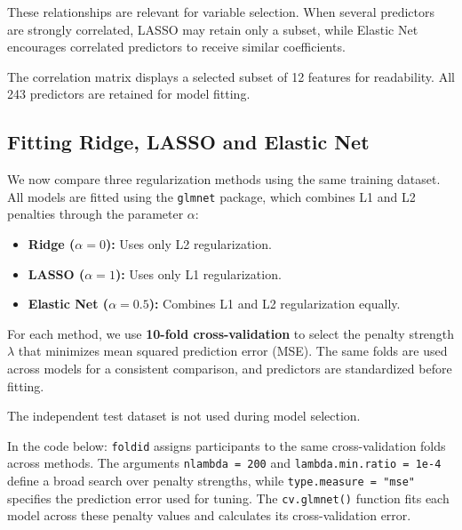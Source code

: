 \documentclass[
  letterpaper,
  DIV=11,
  numbers=noendperiod]{scrreprt}
\providecommand{\tightlist}{%
  \setlength{\itemsep}{0pt}\setlength{\parskip}{0pt}}
\begin{document}
These relationships are relevant for variable selection. When several
predictors are strongly correlated, LASSO may retain only a subset,
while Elastic Net encourages correlated predictors to receive similar
coefficients.

The correlation matrix displays a selected subset of 12 features for
readability. All 243 predictors are retained for model fitting.

\subsection{Fitting Ridge, LASSO and Elastic
Net}\label{fitting-ridge-lasso-and-elastic-net}

We now compare three regularization methods using the same training
dataset. All models are fitted using the \texttt{glmnet} package, which
combines L1 and L2 penalties through the parameter \(\alpha\):

\begin{itemize}
\tightlist
\item
  \textbf{Ridge (\(\alpha=0\)):} Uses only L2 regularization.
\item
  \textbf{LASSO (\(\alpha=1\)):} Uses only L1 regularization.
\item
  \textbf{Elastic Net (\(\alpha=0.5\)):} Combines L1 and L2
  regularization equally.
\end{itemize}

For each method, we use \textbf{10-fold cross-validation} to select the
penalty strength \(\lambda\) that minimizes mean squared prediction
error (MSE). The same folds are used across models for a consistent
comparison, and predictors are standardized before fitting.

The independent test dataset is not used during model selection.

In the code below: \texttt{foldid} assigns participants to the same
cross-validation folds across methods. The arguments
\texttt{nlambda\ =\ 200} and \texttt{lambda.min.ratio\ =\ 1e-4} define a
broad search over penalty strengths, while
\texttt{type.measure\ =\ "mse"} specifies the prediction error used for
tuning. The \texttt{cv.glmnet()} function fits each model across these
penalty values and calculates its cross-validation error.
\end{document}
